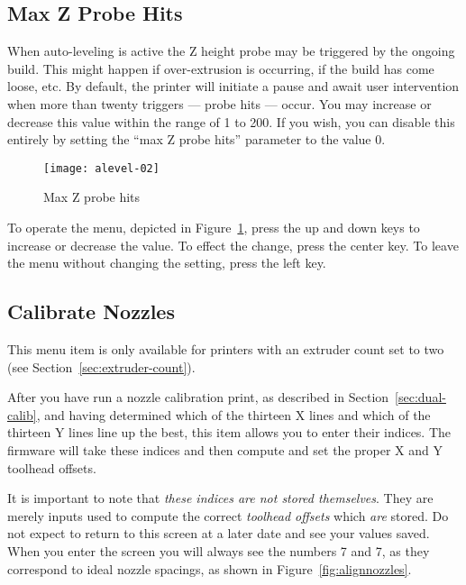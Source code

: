 
\subsection{Max Z Probe Hits} \label{sec:alevel-maxhits}

When auto-leveling is active the Z height probe may be triggered by the ongoing build.  This might happen if over-extrusion is occurring, if the build has come loose, etc.  By default, the printer will initiate a pause and await user intervention when more than twenty triggers --- probe hits --- occur.  You may increase or decrease this value within the range of 1 to 200.  If you wish, you can disable this entirely by setting the ``max Z probe hits'' parameter to the value 0.  

\begin{figure}[!htbp]
  \centering
    \texttt{[image: alevel-02]}
    \caption{Max Z probe hits}
  \label{fig:alevel-maxhits}
\end{figure}

To operate the menu, depicted in Figure~\ref{fig:alevel-maxhits}, press the up and down keys to increase or decrease the value.  To effect the change, press the center key.  To leave the menu without changing the setting, press the left key.


\subsection{Calibrate Nozzles} \label{sec:calibnozz}
This menu item is only available for printers with an extruder count set to two (see Section~\ref{sec:extruder-count}).

After you have run a nozzle calibration print, as described in Section~\ref{sec:dual-calib}, and having determined which of the thirteen X lines and which of the thirteen Y lines line up the best, this item allows you to enter their indices.  The firmware will take these indices and then compute and set the proper X and Y toolhead offsets.

It is important to note that \emph{these indices are not stored themselves}.  They are merely inputs used to compute the correct \emph{toolhead offsets} which \emph{are} stored.  Do not expect to return to this screen at a later date and see your values saved.  When you enter the screen you will always see the numbers 7 and 7, as they correspond to ideal nozzle spacings, as shown in Figure~\ref{fig:alignnozzles}.

